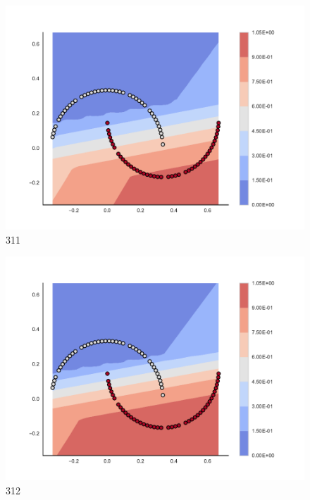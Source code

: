 \begin{subfigure}[b]{0.09\textwidth}
    \includegraphics[clip, trim=2.35cm 1.75cm 4.5cm 0cm,width=\textwidth]{img/convergence/311.pdf}
    \caption{311}
    \label{fig:convergence_311}
\end{subfigure}
%
\begin{subfigure}[b]{0.09\textwidth}
    \includegraphics[clip, trim=2.35cm 1.75cm 4.5cm 0cm,width=\textwidth]{img/convergence/312.pdf}
    \caption{312}
    \label{fig:convergence_312}
\end{subfigure}
%
